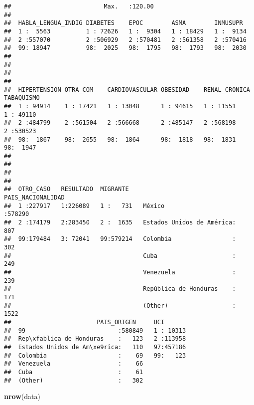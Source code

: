 \documentclass[]{article}
\newenvironment{Shaded}{\begin{snugshade}}{\end{snugshade}}
\newcommand{\KeywordTok}[1]{\textcolor[rgb]{0.13,0.29,0.53}{\textbf{#1}}}
\newcommand{\NormalTok}[1]{#1}
\begin{document}
\begin{verbatim}
##                          Max.   :120.00                           
##                                                                   
##  HABLA_LENGUA_INDIG DIABETES    EPOC        ASMA        INMUSUPR   
##  1 :  5563          1 : 72626   1 :  9304   1 : 18429   1 :  9134  
##  2 :557070          2 :506929   2 :570481   2 :561358   2 :570416  
##  99: 18947          98:  2025   98:  1795   98:  1793   98:  2030  
##                                                                    
##                                                                    
##                                                                    
##                                                                    
##  HIPERTENSION OTRA_COM    CARDIOVASCULAR OBESIDAD    RENAL_CRONICA TABAQUISMO 
##  1 : 94914    1 : 17421   1 : 13048      1 : 94615   1 : 11551     1 : 49110  
##  2 :484799    2 :561504   2 :566668      2 :485147   2 :568198     2 :530523  
##  98:  1867    98:  2655   98:  1864      98:  1818   98:  1831     98:  1947  
##                                                                               
##                                                                               
##                                                                               
##                                                                               
##  OTRO_CASO   RESULTADO  MIGRANTE                    PAIS_NACIONALIDAD 
##  1 :227917   1:226089   1 :   731   México                   :578290  
##  2 :174179   2:283450   2 :  1635   Estados Unidos de América:   807  
##  99:179484   3: 72041   99:579214   Colombia                 :   302  
##                                     Cuba                     :   249  
##                                     Venezuela                :   239  
##                                     República de Honduras    :   171  
##                                     (Other)                  :  1522  
##                        PAIS_ORIGEN     UCI        
##  99                          :580849   1 : 10313  
##  Rep\xfablica de Honduras    :   123   2 :113958  
##  Estados Unidos de Am\xe9rica:   110   97:457186  
##  Colombia                    :    69   99:   123  
##  Venezuela                   :    66              
##  Cuba                        :    61              
##  (Other)                     :   302
\end{verbatim}

\begin{Shaded}
\begin{Highlighting}[]
\KeywordTok{nrow}\NormalTok{(data)}
\end{Highlighting}
\end{Shaded}
\end{document}
